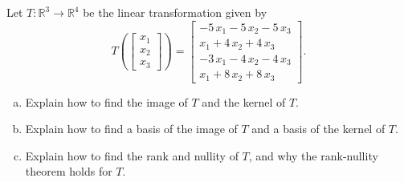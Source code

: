 
\begin{exerciseStatement}
 Let \(T:\mathbb{R}^ 3  \to \mathbb{R}^ 4 \) be the linear transformation given by \[T\left(  \left[\begin{array}{c}
x_{1} \\
x_{2} \\
x_{3}
\end{array}\right]  \right) =  \left[\begin{array}{c}
-5 \, x_{1} - 5 \, x_{2} - 5 \, x_{3} \\
x_{1} + 4 \, x_{2} + 4 \, x_{3} \\
-3 \, x_{1} - 4 \, x_{2} - 4 \, x_{3} \\
x_{1} + 8 \, x_{2} + 8 \, x_{3}
\end{array}\right] .\]
\begin{enumerate}[(a)]
\item Explain how to find the image of \(T\) and the kernel of \(T\).
\item Explain how to find a basis of the image of \(T\) and a basis of the kernel of \(T\).
\item Explain how to find the rank and nullity of \(T\), and why the rank-nullity theorem holds for \(T\).
\end{enumerate}
    
\end{exerciseStatement}
    
